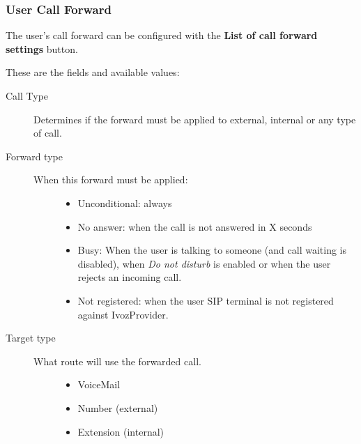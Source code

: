 \documentclass[letterpaper,10pt,spanish]{sphinxmanual}
\begin{document}
\subsubsection{User Call Forward}
\label{administration_portal/client/vpbx/users:user-call-forward}
The user's call forward can be configured with the \textbf{List of call forward settings}  button.

These are the fields and available values:
\begin{description}
\item[{Call Type}] \leavevmode{}\label{administration_portal/client/vpbx/users:term-call-type}
Determines if the forward must be applied to external, internal or any
type of call.

\item[{Forward type}] \leavevmode{}\label{administration_portal/client/vpbx/users:term-forward-type}\begin{description}
\item[{When this forward must be applied:}] \leavevmode\begin{itemize}
\item {} 
Unconditional: always

\item {} 
No answer: when the call is not answered in X seconds

\item {} 
Busy: When the user is talking to someone (and call waiting is
disabled), when \emph{Do not disturb} is enabled or when the user
rejects an incoming call.

\item {} 
Not registered: when the user SIP terminal is not registered
against IvozProvider.

\end{itemize}

\end{description}

\item[{Target type}] \leavevmode{}\label{administration_portal/client/vpbx/users:term-target-type}\begin{description}
\item[{What route will use the forwarded call.}] \leavevmode\begin{itemize}
\item {} 
VoiceMail

\item {} 
Number (external)

\item {} 
Extension (internal)

\end{itemize}

\end{description}

\end{description}
\end{document}

